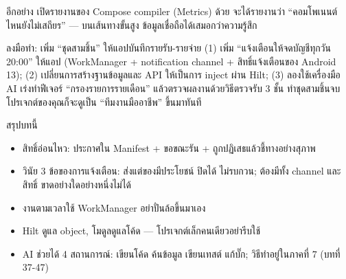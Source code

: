 อีกอย่าง เปิดรายงานของ Compose compiler (Metrics) ด้วย จะได้รายงานว่า “คอมโพเนนต์ไหนยังไม่เสถียร” — บนเส้นทางขั้นสูง ข้อมูลเชื่อถือได้เสมอกว่าความรู้สึก

\begin{tcbpractice}{ลงมือทำ: เพิ่ม “ชุดสามชิ้น” ให้แอปบันทึกรายรับ-รายจ่าย}
(1) เพิ่ม “แจ้งเตือนให้จดบัญชีทุกวัน 20:00” ให้แอป (WorkManager + notification channel + สิทธิ์แจ้งเตือนของ Android 13); (2) เปลี่ยนการสร้างฐานข้อมูลและ API ให้เป็นการ inject ผ่าน Hilt; (3) ลองใช้เครื่องมือ AI เร่งทำฟีเจอร์ “กรองรายการรายเดือน” แล้วตรวจผลงานด้วยวิธีตรวจรับ 3 ชั้น ทำชุดสามชิ้นจบ โปรเจกต์ของคุณก็จะดูเป็น “ทีมงานมืออาชีพ” ขึ้นมาทันที

\end{tcbpractice}

\begin{tcbsummary}{สรุปบทนี้}
\begin{itemize}
  \item สิทธิ์อ่อนไหว: ประกาศใน Manifest + ขอขณะรัน + ถูกปฏิเสธแล้วชี้ทางอย่างสุภาพ
  \item วินัย 3 ข้อของการแจ้งเตือน: ส่งแต่ของมีประโยชน์ ปิดได้ ไม่รบกวน; ต้องมีทั้ง channel และสิทธิ์ ขาดอย่างใดอย่างหนึ่งไม่ได้
  \item งานตามเวลาใช้ WorkManager อย่าปั่นล้อขึ้นมาเอง
  \item Hilt ดูแล object, โมดูลดูแลโค้ด — โปรเจกต์เล็กคนเดียวอย่ารีบใช้
  \item AI ช่วยได้ 4 สถานการณ์: เขียนโค้ด ค้นข้อมูล เขียนเทสต์ แก้บั๊ก; วิธีทำอยู่ในภาคที่ 7 (บทที่ 37-47)
\end{itemize}

\end{tcbsummary}

